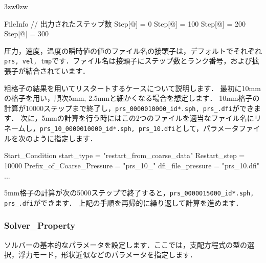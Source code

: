 \begin{indentation}{3zw}{0zw}
{\begin{program}
{  FileInfo {                      // 出力されたステップ数
    Step[@] = 0
    Step[@] = 100
    Step[@] = 200
    Step[@] = 300
  }
}
\end{program}
}

圧力，速度，温度の瞬時値の値のファイル名の接頭子は，デフォルトでそれぞれ\verb|prs, vel, tmp|です．ファイル名は接頭子にステップ数とランク番号，および拡張子が結合されています．

粗格子の結果を用いてリスタートするケースについて説明します．
最初に10mmの格子を用い，順次5mm, 2.5mmと細かくなる場合を想定します．
10mm格子の計算が10000ステップまで終了し，\verb|prs_0000010000_id*.sph, prs_.dfi|ができます．
次に，5mmの計算を行う時にはこの2つのファイルを適当なファイル名にリネームし，\verb|prs_10_0000010000_id*.sph, prs_10.dfi|として，パラメータファイルを次のように指定します．

{\small
\begin{program}
  Start_Condition {
    start_type                   = "restart_from_coarse_data"
    Restart_step                 = 10000
    Prefix_of_Coarse_Pressure    = "prs_10_"
    dfi_file_pressure            = "prs_10.dfi"
    ...
  }
\end{program}
}

5mm格子の計算が次の5000ステップで終了すると，\verb|prs_0000015000_id*.sph, prs_.dfi|ができます．
上記の手順を再帰的に繰り返して計算を進めます．

\end{indentation}



\pagebreak
\subsubsection{Solver\_Property}

ソルバーの\hypertarget{tgt:solver_property}{基本的なパラメータ}を設定します．ここでは，支配方程式の型の選択，浮力モード，形状近似などのパラメータを指定します．

